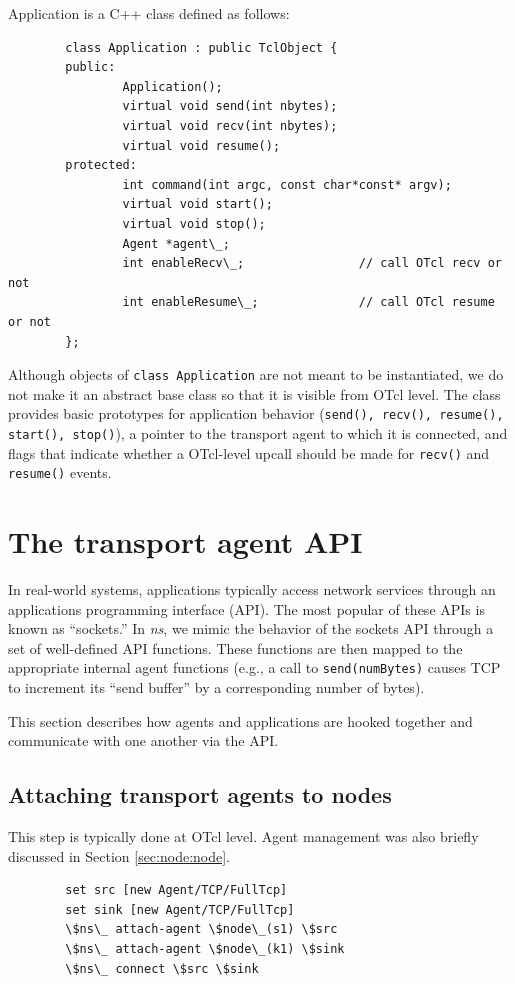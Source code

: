 Application is a C++ class defined as follows:
\begin{verbatim}
        class Application : public TclObject {
        public:
                Application();
                virtual void send(int nbytes);
                virtual void recv(int nbytes);
                virtual void resume();
        protected:
                int command(int argc, const char*const* argv);
                virtual void start();
                virtual void stop();
                Agent *agent\_;
                int enableRecv\_;                // call OTcl recv or not
                int enableResume\_;              // call OTcl resume or not
        };
\end{verbatim}
Although objects of {\tt class Application} are not meant to be instantiated,
we do not make it an abstract base class so that it is visible from OTcl level.
The class provides basic prototypes for application behavior 
({\tt send(), recv(), resume(), start(), stop()}), a pointer to the 
transport agent to which it is connected, and flags that indicate whether
a OTcl-level upcall should be made for {\tt recv()} and 
{\tt resume()} events.  

\section{The transport agent API}
In real-world systems, applications typically access network services through
an applications programming interface (API).  The most popular
of these APIs is known as ``sockets.''  In \emph{ns}, we mimic the behavior of the
sockets API through a set of well-defined API functions.  These functions 
are then mapped to the appropriate internal agent functions (e.g.,
a call to {\tt send(numBytes)} causes TCP to increment its ``send buffer'' 
by a corresponding number of bytes).

This section describes how agents and applications are hooked together and
communicate with one another via the API.

\subsection{Attaching transport agents to nodes}
\label{sec:attachagentnode}
This step is typically done at OTcl level.  Agent management was also briefly
discussed in Section \ref{sec:node:node}.  

\begin{verbatim}
        set src [new Agent/TCP/FullTcp]
        set sink [new Agent/TCP/FullTcp]
        \$ns\_ attach-agent \$node\_(s1) \$src
        \$ns\_ attach-agent \$node\_(k1) \$sink
        \$ns\_ connect \$src \$sink
\end{verbatim}

